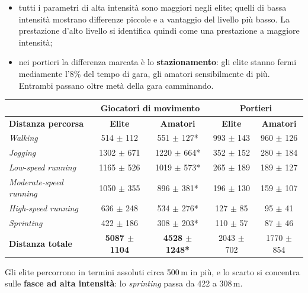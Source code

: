 \begin{itemize}
  \item tutti i parametri di alta intensità sono maggiori negli elite; quelli di bassa intensità
    mostrano differenze piccole e a vantaggio del livello più basso. La prestazione d'alto livello
    si identifica quindi come una prestazione a maggiore intensità;
  \item nei portieri la differenza marcata è lo \textbf{stazionamento}: gli elite stanno fermi
    mediamente l'8\% del tempo di gara, gli amatori sensibilmente di più. Entrambi passano oltre
    metà della gara camminando.
\end{itemize}


\begin{center}
\footnotesize
\begin{tabular}{|l|c|c|c|c|}
\hline
 & \multicolumn{2}{c|}{\textbf{Giocatori di movimento}} & \multicolumn{2}{c|}{\textbf{Portieri}} \\
\hline
\textbf{Distanza percorsa} & \textbf{Elite} & \textbf{Amatori} & \textbf{Elite} & \textbf{Amatori} \\
\hline
\textit{Walking}               & 514 $\pm$ 112   & 551 $\pm$ 127*   & 993 $\pm$ 143  & 960 $\pm$ 126 \\
\textit{Jogging}               & 1302 $\pm$ 671  & 1220 $\pm$ 664*  & 352 $\pm$ 152  & 280 $\pm$ 184 \\
\textit{Low-speed running}     & 1165 $\pm$ 526  & 1019 $\pm$ 573*  & 265 $\pm$ 189  & 189 $\pm$ 127 \\
\textit{Moderate-speed running}& 1050 $\pm$ 355  & 896 $\pm$ 381*   & 196 $\pm$ 130  & 159 $\pm$ 107 \\
\textit{High-speed running}    & 636 $\pm$ 248   & 534 $\pm$ 276*   & 127 $\pm$ 85   & 95 $\pm$ 41 \\
\textit{Sprinting}             & 422 $\pm$ 186   & 308 $\pm$ 203*   & 110 $\pm$ 57   & 87 $\pm$ 46 \\
\hline
\textbf{Distanza totale}       & \textbf{5087 $\pm$ 1104} & \textbf{4528 $\pm$ 1248*} & 2043 $\pm$ 702 & 1770 $\pm$ 854 \\
\hline
\end{tabular}
\end{center}

Gli elite percorrono in termini assoluti circa 500\,m in più, e lo scarto si concentra sulle
\textbf{fasce ad alta intensità}: lo \textit{sprinting} passa da 422 a 308\,m.

